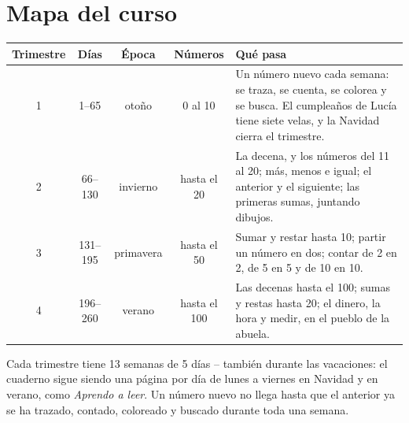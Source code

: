 \section*{Mapa del curso}

\begin{center}
\renewcommand{\arraystretch}{1.4}
\begin{tabularx}{\linewidth}{@{}c c c c X@{}}
\toprule
\textbf{Trimestre} & \textbf{Días} & \textbf{Época} & \textbf{Números} & \textbf{Qué pasa} \\
\midrule
1 & 1--65 & otoño & 0 al 10 & Un número nuevo cada semana: se traza, se
cuenta, se colorea y se busca. El cumpleaños de Lucía tiene siete velas,
y la Navidad cierra el trimestre. \\
2 & 66--130 & invierno & hasta el 20 & La decena, y los números del 11
al 20; más, menos e igual; el anterior y el siguiente; las primeras
sumas, juntando dibujos. \\
3 & 131--195 & primavera & hasta el 50 & Sumar y restar hasta 10;
partir un número en dos; contar de 2 en 2, de 5 en 5 y de 10 en 10. \\
4 & 196--260 & verano & hasta el 100 & Las decenas hasta el 100; sumas y
restas hasta 20; el dinero, la hora y medir, en el pueblo de la abuela. \\
\bottomrule
\end{tabularx}
\end{center}

\vspace{6mm}
Cada trimestre tiene 13 semanas de 5 días -- también durante las
vacaciones: el cuaderno sigue siendo una página por día de lunes a
viernes en Navidad y en verano, como \emph{Aprendo a leer}. Un número
nuevo no llega hasta que el anterior ya se ha trazado, contado,
coloreado y buscado durante toda una semana.
\newpage
